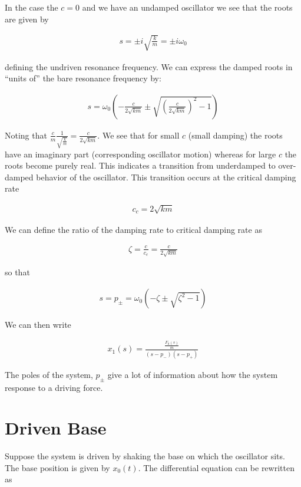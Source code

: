 \documentclass[12pt]{article}
\begin{document}
In the case the $c=0$ and we have an undamped oscillator we see that the roots are given by

\begin{align}
s = \pm i \sqrt{\frac{k}{m}} = \pm i \omega_0
\end{align}

defining the undriven resonance frequency. We can express the damped roots in ``units of'' the bare resonance frequency by:

\begin{align}
s = \omega_0\left(-\frac{c}{2\sqrt{k m}} \pm \sqrt{\left(\frac{c}{2\sqrt{km}} \right)^2 - 1} \right)
\end{align}

Noting that $\frac{c}{m} \frac{1}{\sqrt{\frac{k}{m}}} = \frac{c}{2\sqrt{km}}$. We see that for small $c$ (small damping) the roots have an imaginary part (corresponding oscillator motion) whereas for large $c$ the roots become purely real. This indicates a transition from underdamped to over-damped behavior of the oscillator. This transition occurs at the critical damping rate

\begin{align}
c_c = 2\sqrt{km}
\end{align}

We can define the ratio of the damping rate to critical damping rate as

\begin{align}
\zeta = \frac{c}{c_c} = \frac{c}{2\sqrt{km}}
\end{align}

so that

\begin{align}
s = p_{\pm} = \omega_0\left(-\zeta \pm \sqrt{\zeta^2 -1} \right)
\end{align}

We can then write

\begin{align}
x_1(s) = \frac{\frac{F_0(s)}{m}}{(s-p_-)(s-p_+)}
\end{align}

The poles of the system, $p_{\pm}$ give a lot of information about how the system response to a driving force.

\section{Driven Base}

Suppose the system is driven by shaking the base on which the oscillator sits. The base position is given by $x_0(t)$. The differential equation can be rewritten as
\end{document}
